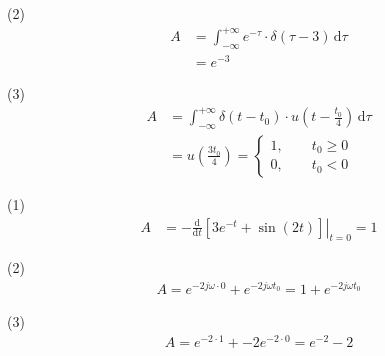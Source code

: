 (2)
\begin{align*}
    A&=\int_{-\infty}^{+\infty}e^{-\tau}\cdot\delta(\tau-3)\,\mathrm{d}\tau \\
    &=e^{-3}
\end{align*}

(3)
\begin{align*}
    A&=\int_{-\infty}^{+\infty}\delta(t-t_0)\cdot u(t - \frac{t_0}{4})\,\mathrm{d}\tau \\
    &=u(\frac{3t_0}{4})=
    \left\{\begin{array}{l}
        1, \qquad t_0\ge0 \\
        0, \qquad t_0<0
    \end{array}\right.
\end{align*}


(1)
\begin{align*}
    A&=-\left.\frac{\mathrm{d}}{\mathrm{d}t}[3e^{-t}+\sin(2t)]\right|_{t=0}=1
\end{align*}

(2)
\begin{align*}
    A=e^{-2j\omega\cdot0}+e^{-2j\omega t_0}=1+e^{-2j\omega t_0}
\end{align*}

(3)
\begin{align*}
    A=e^{-2\cdot1}+-2e^{-2\cdot0}=e^{-2}-2
\end{align*}